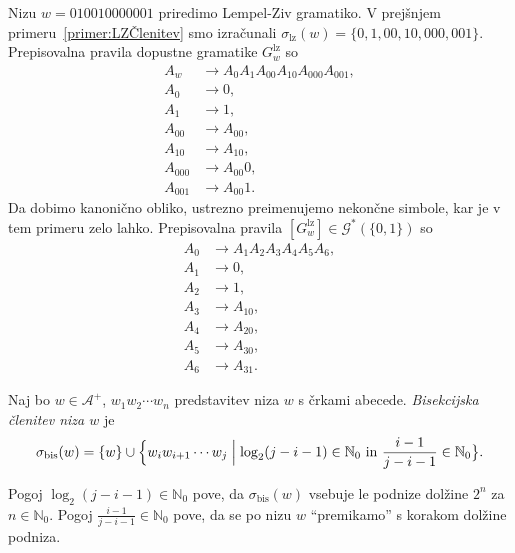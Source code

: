 \documentclass[fin1, tisk]{fmfdelo}
\newcommand{\N}{\mathbb{N}}
\newcommand{\A}{\mathcal{A}}
\newcommand{\G}{\mathcal{G}}
\theoremstyle{definition}
\begin{document}
\begin{primer}
    Nizu $w = 010010000001$ priredimo Lempel-Ziv gramatiko. V prejšnjem 
    primeru~\ref{primer:LZČlenitev} smo izračunali 
    $\sigma_{\text{lz}}(w) = \{ 0, 1, 00, 10, 000, 001 \}$. Prepisovalna pravila dopustne 
    gramatike $G^\text{lz}_w$ so
    \begin{align*}
        A_w &\rightarrow A_0A_1A_{00}A_{10}A_{000}A_{001}, \\
        A_0 &\rightarrow 0, \\
        A_1 &\rightarrow 1, \\
        A_{00} &\rightarrow A_00, \\
        A_{10} &\rightarrow A_10, \\
        A_{000} &\rightarrow A_{00}0, \\
        A_{001} &\rightarrow A_{00}1.
    \end{align*}
    Da dobimo kanonično obliko, ustrezno preimenujemo nekončne simbole, kar
    je v tem primeru zelo lahko. Prepisovalna pravila $[G^\text{lz}_w] \in \G^*(\{ 0, 1 \})$ so
    \begin{align*}
        A_0 &\rightarrow A_1A_2A_3A_4A_5A_6, \\
        A_1 &\rightarrow 0, \\
        A_2 &\rightarrow 1, \\
        A_3 &\rightarrow A_10, \\
        A_4 &\rightarrow A_20, \\
        A_5 &\rightarrow A_30, \\
        A_6 &\rightarrow A_31.
    \end{align*}
\end{primer}

\begin{definicija}
    Naj bo $w \in \A^+$, $w_1w_2 \cdots w_n$ predstavitev niza $w$ s črkami abecede. 
    \emph{Bisekcijska členitev niza $w$} je
    \[
        \sigma_{\text{bis}}(w) = \{ w \} \cup \Bigl\{ w_iw_{i+1} \cdots w_j \Bigm| \log_2(j-i-1) \in \N_0
        \text{ in } \frac{i-1}{j-i-1} \in \N_0 \bigr\}.
    \]
\end{definicija}

\begin{opomba}
    Pogoj $\log_2(j-i-1) \in \N_0$ pove, da $\sigma_{\text{bis}}(w)$ vsebuje le podnize dolžine
    $2^n$ za $n \in \N_0$.  Pogoj $\frac{i-1}{j-i-1} \in \N_0$ pove, da se po nizu $w$ 
    ``premikamo'' s korakom dolžine podniza.
\end{opomba}
\end{document}
